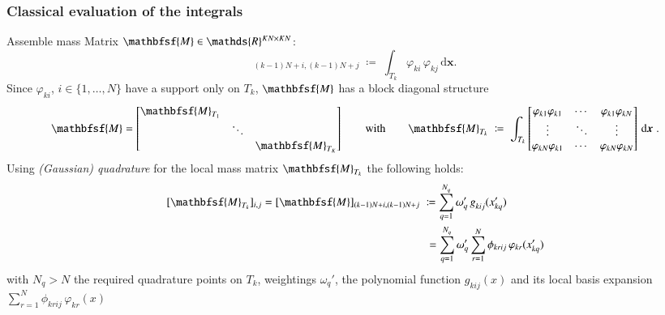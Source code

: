 \documentclass[final,12pt]{beamer}
\newcommand{\IR}{\ensuremath\mathds{R}}
\newcommand*{\vphi}{\varphi}                                     %
\renewcommand*{\vec}[1]{{\boldsymbol{#1}}}                       %
\newcommand*{\vecc}[1]{\mathbfsf{#1}}                            %
\newcommand*{\dd}{\mathrm{d}}                                    %
\begin{document}
\begin{frame}
  \frametitle{Classical evaluation of the integrals}
  Assemble mass Matrix
  \(\vecc{M}\in\IR^{{KN\times KN}}\):
  \begin{equation*}
    [\vecc{M}]_{(k-1)N+i,(k-1)N+j} \;\coloneqq\; \int_{T_k} \vphi_{ki} \, \vphi_{kj} \, \dd\vec{x}.
  \end{equation*}
  Since $\vphi_{ki}$, $i\in\{1,\ldots,N\}$ have a support only on $T_k$, $\vecc{M}$ has a block diagonal structure
  \begin{equation*}
    \vecc{M} = \begin{bmatrix} \vecc{M}_{T_1} & & \\ & \ddots & \\ & & \vecc{M}_{T_K} \end{bmatrix}
    \qquad\text{with}\qquad
    \vecc{M}_{T_k} \;\coloneqq\; \int_{T_k} \begin{bmatrix}
    \vphi_{k1}\vphi_{k1} & \cdots & \vphi_{k1}\vphi_{kN} \\
    \vdots               & \ddots & \vdots               \\
    \vphi_{kN}\vphi_{k1} & \cdots & \vphi_{kN}\vphi_{kN}
    \end{bmatrix}\,\dd\vec{x}\;.
  \end{equation*}
  Using \emph{(Gaussian) quadrature} for the local mass matrix
  \(\vecc{M}_{T_k}\) the following holds:
  \begin{equation*}
    \begin{split}
      [\vecc{M}_{T_k}]_{i,j}=[\vecc{M}]_{(k-1)N+i,(k-1)N+j} \;
        &\coloneqq\sum_{q=1}^{N_q^{}} \omega_q'\,g_{kij}^{}(x_{kq}')\\
        &\;=\sum_{q=1}^{N_q^{}}\omega_q'\sum_{r=1}^N\phi_{krij}\,\vphi_{kr}(x_{kq}')
    \end{split}
  \end{equation*}
  with \(N_q > N\) the required quadrature points on \(T_k\),
  weightings \(\omega_q'\),
  the polynomial function \(g_{kij}(x)\) and its local basis expansion
  \(\sum_{r=1}^N\phi_{krij}^{}\,\vphi_{kr}^{}(x)\)

\end{frame}
\end{document}
